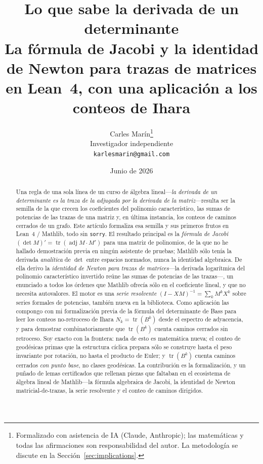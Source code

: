 \documentclass[11pt]{article}
\title{\bf Lo que sabe la derivada de un determinante\\[4pt]
  \large\normalfont La f\'ormula de Jacobi y la identidad de Newton para trazas de matrices
  en Lean~4, con una aplicaci\'on a los conteos de Ihara}
\author{Carles Mar\'in\thanks{Formalizado con asistencia de IA (Claude, Anthropic); las matem\'aticas
y todas las afirmaciones son responsabilidad del autor. La metodolog\'ia se discute en la
Secci\'on~\ref{sec:implications}.}\\[3pt]
  \normalsize Investigador independiente\\
  \normalsize \texttt{karlesmarin@gmail.com}}
\date{Junio de 2026}
\newcommand{\lean}[1]{{\def\_{\textunderscore\allowbreak}\texttt{#1}}}
\newcommand{\tr}{\operatorname{tr}}
\newcommand{\adj}{\operatorname{adj}}
\begin{document}
\maketitle

\begin{abstract}
Una regla de una sola l\'inea de un curso de \'algebra lineal---\emph{la derivada de un determinante
es la traza de la adjugada por la derivada de la matriz}---resulta ser la semilla de la que crecen
los coeficientes del polinomio caracter\'istico, las sumas de potencias de las trazas de una matriz
y, en \'ultima instancia, los conteos de caminos cerrados de un grafo. Este art\'iculo formaliza esa
semilla y sus primeros frutos en Lean~4 / Mathlib, todo sin \lean{sorry}. El resultado principal es
la \emph{f\'ormula de Jacobi} $(\det M)'=\tr(\adj M\cdot M')$ para una matriz de polinomios, de la
que no he hallado demostraci\'on previa en ning\'un asistente de pruebas; Mathlib s\'olo ten\'ia la
derivada \emph{anal\'itica} de $\det$ entre espacios normados, nunca la identidad algebraica. De
ella derivo la \emph{identidad de Newton para trazas de matrices}---la derivada logar\'itmica del
polinomio caracter\'istico invertido re\'une las sumas de potencias de las trazas---, un enunciado a
todos los \'ordenes que Mathlib ofrec\'ia s\'olo en el coeficiente lineal, y que no necesita
autovalores. El motor es una \emph{serie resolvente} $(I-XM)^{-1}=\sum_k M^kX^k$ sobre series formales
de potencias, tambi\'en nueva en la biblioteca. Como aplicaci\'on las compongo con mi formalizaci\'on
previa de la f\'ormula del determinante de Bass para leer los conteos no-retroceso de Ihara
$N_k=\tr(B^k)$ desde el espectro de adyacencia, y para demostrar combinatoriamente que $\tr(B^k)$
cuenta caminos cerrados sin retroceso. Soy exacto con la frontera: nada de esto es matem\'atica
nueva; el conteo de geod\'esicas primas que la estructura c\'iclica prepara s\'olo se construye hasta
el peso invariante por rotaci\'on, no hasta el producto de Euler; y $\tr(B^k)$ cuenta caminos cerrados
\emph{con punto base}, no clases geod\'esicas. La contribuci\'on es la formalizaci\'on, y un pu\~nado
de lemas certificados que rellenan piezas que faltaban en el ecosistema de \'algebra lineal de
Mathlib---la f\'ormula algebraica de Jacobi, la identidad de Newton matricial-de-trazas, la serie
resolvente y el conteo de caminos dirigidos.
\end{abstract}
\end{document}
